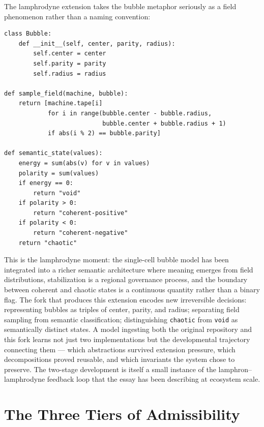 \documentclass[12pt]{article}
\begin{document}
The lamphrodyne extension takes the bubble metaphor seriously as a field
phenomenon rather than a naming convention:

\begin{lstlisting}
class Bubble:
    def __init__(self, center, parity, radius):
        self.center = center
        self.parity = parity
        self.radius = radius

def sample_field(machine, bubble):
    return [machine.tape[i]
            for i in range(bubble.center - bubble.radius,
                           bubble.center + bubble.radius + 1)
            if abs(i % 2) == bubble.parity]

def semantic_state(values):
    energy = sum(abs(v) for v in values)
    polarity = sum(values)
    if energy == 0:
        return "void"
    if polarity > 0:
        return "coherent-positive"
    if polarity < 0:
        return "coherent-negative"
    return "chaotic"
\end{lstlisting}

This is the lamphrodyne moment: the single-cell bubble model has been integrated
into a richer semantic architecture where meaning emerges from field
distributions, stabilization is a regional governance process, and the boundary
between coherent and chaotic states is a continuous quantity rather than a binary
flag. The fork that produces this extension encodes new irreversible decisions:
representing bubbles as triples of center, parity, and radius; separating field
sampling from semantic classification; distinguishing \texttt{chaotic} from
\texttt{void} as semantically distinct states. A model ingesting both the
original repository and this fork learns not just two implementations but the
developmental trajectory connecting them --- which abstractions survived
extension pressure, which decompositions proved reusable, and which invariants
the system chose to preserve. The two-stage development is itself a small
instance of the lamphron--lamphrodyne feedback loop that the essay has been
describing at ecosystem scale.

\section{The Three Tiers of Admissibility}
\end{document}
